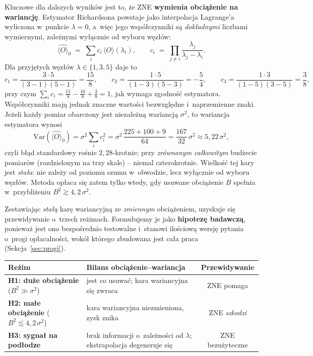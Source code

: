 \documentclass[11pt]{article}
\newcommand{\expv}{\langle O\rangle}
\begin{document}
Kluczowe dla dalszych wyników jest to, że ZNE \textbf{wymienia obciążenie na wariancję}. Estymator
Richardsona powstaje jako interpolacja Lagrange'a wyliczona w~punkcie $\lambda=0$, a~więc jego
współczynniki są \emph{dokładnymi} liczbami wymiernymi, zależnymi wyłącznie od wyboru węzłów:
\begin{equation}
  \hat{\expv}_0 \;=\; \sum_i c_i\,\expv(\lambda_i),
  \qquad
  c_i \;=\; \prod_{j\neq i}\frac{\lambda_j}{\lambda_j-\lambda_i} .
  \label{eq:richardson}
\end{equation}
Dla przyjętych węzłów $\lambda\in\{1,3,5\}$ daje to
\begin{equation}
  c_1 = \frac{3\cdot 5}{(3-1)(5-1)} = \frac{15}{8}, \qquad
  c_2 = \frac{1\cdot 5}{(1-3)(5-3)} = -\frac{5}{4}, \qquad
  c_3 = \frac{1\cdot 3}{(1-5)(3-5)} = \frac{3}{8},
\end{equation}
przy czym $\sum_i c_i = \tfrac{15}{8}-\tfrac{10}{8}+\tfrac{3}{8} = 1$, jak wymaga zgodność estymatora.
Współczynniki mają jednak znaczne wartości bezwzględne i~naprzemienne znaki. Jeżeli każdy pomiar
obarczony jest niezależną wariancją $\sigma^2$, to wariancja estymatora wynosi
\begin{equation}
  \mathrm{Var}(\hat{\expv}_0) = \sigma^2 \sum_i c_i^2
  = \sigma^2\,\frac{225+100+9}{64} = \frac{167}{32}\,\sigma^2 \approx 5{,}22\,\sigma^2 ,
\end{equation}
czyli błąd standardowy rośnie $2{,}28$-krotnie; przy \emph{zrównanym całkowitym} budżecie pomiarów
(rozdzielonym na trzy skale) -- niemal czterokrotnie. Wielkość tej kary jest
\emph{stała}: nie zależy od poziomu szumu w~obwodzie, lecz wyłącznie od wyboru węzłów. Metoda
opłaca się zatem tylko wtedy, gdy usuwane obciążenie $B$ spełnia w~przybliżeniu
$B^2 \gtrsim 4{,}2\,\sigma^2$.

Zestawiając \emph{stałą} karę wariancyjną ze \emph{zmiennym} obciążeniem, uzyskuje się przewidywanie
o~trzech reżimach. Formułujemy je jako \textbf{hipotezę badawczą}, ponieważ jest ono bezpośrednio
testowalne i~stanowi ilościową wersję pytania o~progi opłacalności, wokół którego zbudowana jest cała
praca (Sekcja~\ref{sec:progi}).

\begin{center}
\begin{tabular}{p{4.3cm}p{5.4cm}c}
\toprule
Reżim & Bilans obciążenie--wariancja & Przewidywanie \\
\midrule
\textbf{H1: duże obciążenie} \newline ($B^2 \gg \sigma^2$)
  & jest co usuwać; kara wariancyjna się zwraca & ZNE pomaga \\[2pt]
\textbf{H2: małe obciążenie} \newline ($B^2 \lesssim 4{,}2\,\sigma^2$)
  & kara wariancyjna niezmieniona, zysk znika & ZNE \emph{szkodzi} \\[2pt]
\textbf{H3: sygnał na podłodze}
  & brak informacji o~zależności od $\lambda$; ekstrapolacja degeneruje się & ZNE bezużyteczne \\
\bottomrule
\end{tabular}
\end{center}
\end{document}
